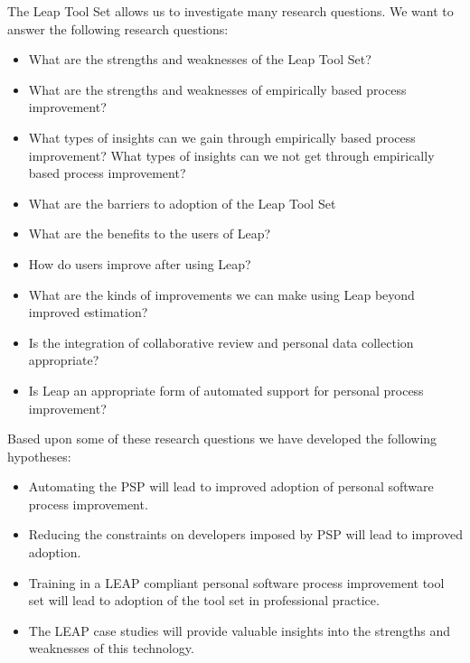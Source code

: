 \documentclass[12pt]{article}
\begin{document}
The Leap Tool Set allows us to investigate many research questions.  We
want to answer the following research questions:
\begin{itemize}

\item{What are the strengths and weaknesses of the Leap Tool Set?}
  
\item{What are the strengths and weaknesses of empirically based process
    improvement?}
  
\item{What types of insights can we gain through empirically based
    process improvement?  What types of insights can we not get through
    empirically based process improvement?}

\item{What are the barriers to adoption of the Leap Tool Set}
  
\item{What are the benefits to the users of Leap?}

\item{How do users improve after using Leap?}
  
\item{What are the kinds of improvements we can make using Leap beyond
    improved estimation?}

\item{Is the integration of collaborative review and personal data
    collection appropriate?}
  
\item{Is Leap an appropriate form of automated support for personal process
    improvement?}

\end{itemize}

Based upon some of these research questions we have developed the following 
hypotheses:
\begin{itemize}
\item{Automating the PSP will lead to improved adoption of personal
    software process improvement.}

\item {Reducing the constraints on developers imposed by PSP will lead to
    improved adoption.}
  
\item {Training in a LEAP compliant personal software process improvement
    tool set will lead to adoption of the tool set in professional practice.}
  
\item {The LEAP case studies will provide valuable insights into the strengths
    and weaknesses of this technology.}

\end{itemize}
\end{document}
